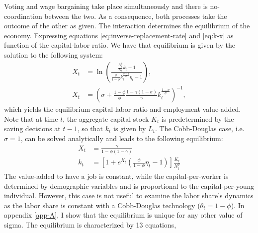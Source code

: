 \documentclass[
]{article}
\begin{document}
Voting and wage bargaining take place simultaneously and there is no-coordination between the two. As a consequence, both processes take the outcome of the other as given. The interaction determines the equilibrium of the economy. Expressing equations \eqref{eq:inverse-replacement-rate} and \eqref{eq:k-x} as function of the capital-labor ratio. We have that equilibrium is given by the solution to the following system:
\begin{align}
  X_t &= \ln\left( \frac{ \frac{N_t^y}{K_t} k_t - 1 } { \frac{\phi}{1-\phi}     
  k_t^{\frac{\sigma-1}{\sigma}} \eta_t - 1 }\right), \label{eq:Xg} \\ 
    X_t &= \left( \sigma + \frac{1-\phi}{\phi} \frac{1-\gamma(1-\sigma)}{\gamma} k_t^{\frac{1-\sigma}{\sigma}} \right)^{-1}, \label{eq:Xh}
    \end{align}
which yields the equilibrium capital-labor ratio and employment value-added. Note that at time \(t\), the aggregate capital stock \(K_t\) is predetermined by the saving decisions at \(t-1\), so that \(k_t\) is given by \(L_t\). The Cobb-Douglas case, i.e.~\(\sigma = 1\), can be solved analytically and leads to the following equilibrium:
\begin{align*}
    X_t &= \frac{\gamma}{1-\phi(1-\gamma)} \\
    k_t &= \left[1 + e^{X_t}\left(\frac{\phi}{1-\phi}\eta_t-1\right)\right]\frac{K_t}{N_t^y}
\end{align*}
The value-added to have a job is constant, while the capital-per-worker is determined by demographic variables and is proportional to the capital-per-young individual. However, this case is not useful to examine the labor share's dynamics as the labor share is constant with a Cobb-Douglas technology (\(\theta_t = 1-\phi\)). In appendix \ref{app-A}, I show that the equilibrium is unique for any other value of sigma. The equilibrium is characterized by 13 equations,
\end{document}
